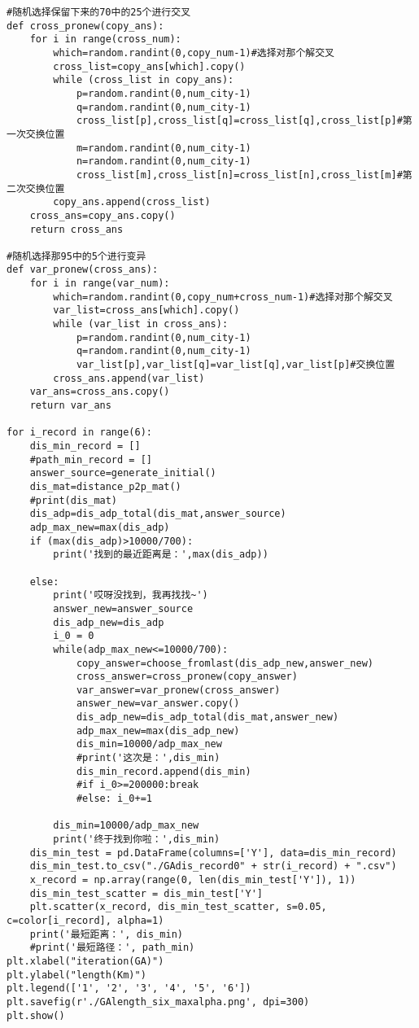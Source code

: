 \begin{lstlisting}
#随机选择保留下来的70中的25个进行交叉
def cross_pronew(copy_ans):
    for i in range(cross_num):
        which=random.randint(0,copy_num-1)#选择对那个解交叉
        cross_list=copy_ans[which].copy()
        while (cross_list in copy_ans):
            p=random.randint(0,num_city-1)
            q=random.randint(0,num_city-1)
            cross_list[p],cross_list[q]=cross_list[q],cross_list[p]#第一次交换位置
            m=random.randint(0,num_city-1)
            n=random.randint(0,num_city-1)
            cross_list[m],cross_list[n]=cross_list[n],cross_list[m]#第二次交换位置            
        copy_ans.append(cross_list)
    cross_ans=copy_ans.copy()
    return cross_ans

#随机选择那95中的5个进行变异
def var_pronew(cross_ans):
    for i in range(var_num):
        which=random.randint(0,copy_num+cross_num-1)#选择对那个解交叉
        var_list=cross_ans[which].copy()
        while (var_list in cross_ans):
            p=random.randint(0,num_city-1)
            q=random.randint(0,num_city-1)
            var_list[p],var_list[q]=var_list[q],var_list[p]#交换位置
        cross_ans.append(var_list)
    var_ans=cross_ans.copy()
    return var_ans

for i_record in range(6):
    dis_min_record = []
    #path_min_record = []
    answer_source=generate_initial()
    dis_mat=distance_p2p_mat()
    #print(dis_mat)
    dis_adp=dis_adp_total(dis_mat,answer_source)
    adp_max_new=max(dis_adp)
    if (max(dis_adp)>10000/700):
        print('找到的最近距离是：',max(dis_adp))

    else:
        print('哎呀没找到，我再找找~')
        answer_new=answer_source
        dis_adp_new=dis_adp
        i_0 = 0
        while(adp_max_new<=10000/700):
            copy_answer=choose_fromlast(dis_adp_new,answer_new)
            cross_answer=cross_pronew(copy_answer)
            var_answer=var_pronew(cross_answer)
            answer_new=var_answer.copy()
            dis_adp_new=dis_adp_total(dis_mat,answer_new)
            adp_max_new=max(dis_adp_new)
            dis_min=10000/adp_max_new
            #print('这次是：',dis_min)
            dis_min_record.append(dis_min)
            #if i_0>=200000:break
            #else: i_0+=1

        dis_min=10000/adp_max_new
        print('终于找到你啦：',dis_min)
    dis_min_test = pd.DataFrame(columns=['Y'], data=dis_min_record)
    dis_min_test.to_csv("./GAdis_record0" + str(i_record) + ".csv")
    x_record = np.array(range(0, len(dis_min_test['Y']), 1))
    dis_min_test_scatter = dis_min_test['Y']
    plt.scatter(x_record, dis_min_test_scatter, s=0.05, c=color[i_record], alpha=1)
    print('最短距离：', dis_min)
    #print('最短路径：', path_min)
plt.xlabel("iteration(GA)")
plt.ylabel("length(Km)")
plt.legend(['1', '2', '3', '4', '5', '6'])
plt.savefig(r'./GAlength_six_maxalpha.png', dpi=300)
plt.show()


\end{lstlisting}
